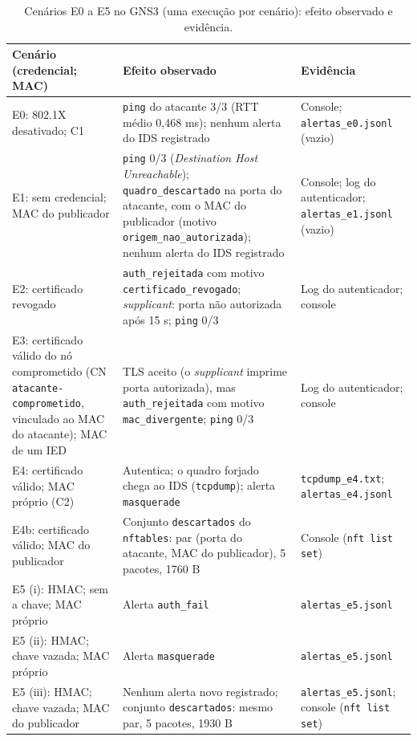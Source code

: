 \documentclass[12pt]{article}
\begin{document}
\begin{table}[!t]
\centering
\caption{Cenários E0 a E5 no GNS3 (uma execução por cenário): efeito observado e evidência.}\label{tab:15}
\footnotesize
\renewcommand{\arraystretch}{1.25}
\begin{tabularx}{\linewidth}{|>{\hsize=1.100\hsize\raggedright\arraybackslash}X|>{\hsize=1.171\hsize\raggedright\arraybackslash}X|>{\hsize=0.729\hsize\raggedright\arraybackslash}X|}
\hline
\textbf{Cenário (credencial; MAC)} & \textbf{Efeito observado} & \textbf{Evidência} \\ \hline
E0: 802.1X desativado; C1 & \texttt{ping} do atacante 3/3 (RTT médio 0,468 ms); nenhum alerta do IDS registrado & Console; \texttt{alertas\_\allowbreak{}e0.\allowbreak{}jsonl} (vazio) \\ \hline
E1: sem credencial; MAC do publicador & \texttt{ping} 0/3 (\emph{Destination Host Unreachable}); \texttt{quadro\_\allowbreak{}descartado} na porta do atacante, com o MAC do publicador (motivo \texttt{origem\_\allowbreak{}nao\_\allowbreak{}autorizada}); nenhum alerta do IDS registrado & Console; log do autenticador; \texttt{alertas\_\allowbreak{}e1.\allowbreak{}jsonl} (vazio) \\ \hline
E2: certificado revogado & \texttt{auth\_\allowbreak{}rejeitada} com motivo \texttt{certificado\_\allowbreak{}revogado}; \emph{supplicant}: porta não autorizada após 15 s; \texttt{ping} 0/3 & Log do autenticador; console \\ \hline
E3: certificado válido do nó comprometido (CN \texttt{atacante{-}comprometido}, vinculado ao MAC do atacante); MAC de um IED & TLS aceito (o \emph{supplicant} imprime porta autorizada), mas \texttt{auth\_\allowbreak{}rejeitada} com motivo \texttt{mac\_\allowbreak{}divergente}; \texttt{ping} 0/3 & Log do autenticador; console \\ \hline
E4: certificado válido; MAC próprio (C2) & Autentica; o quadro forjado chega ao IDS (\texttt{tcpdump}); alerta \texttt{masquerade} & \texttt{tcpdump\_\allowbreak{}e4.\allowbreak{}txt}; \texttt{alertas\_\allowbreak{}e4.\allowbreak{}jsonl} \\ \hline
E4b: certificado válido; MAC do publicador & Conjunto \texttt{descartados} do \texttt{nftables}: par (porta do atacante, MAC do publicador), 5 pacotes, 1760 B & Console (\texttt{nft list set}) \\ \hline
E5 (i): HMAC; sem a chave; MAC próprio & Alerta \texttt{auth\_\allowbreak{}fail} & \texttt{alertas\_\allowbreak{}e5.\allowbreak{}jsonl} \\ \hline
E5 (ii): HMAC; chave vazada; MAC próprio & Alerta \texttt{masquerade} & \texttt{alertas\_\allowbreak{}e5.\allowbreak{}jsonl} \\ \hline
E5 (iii): HMAC; chave vazada; MAC do publicador & Nenhum alerta novo registrado; conjunto \texttt{descartados}: mesmo par, 5 pacotes, 1930 B & \texttt{alertas\_\allowbreak{}e5.\allowbreak{}jsonl}; console (\texttt{nft list set}) \\ \hline
\end{tabularx}
\end{table}
\end{document}
